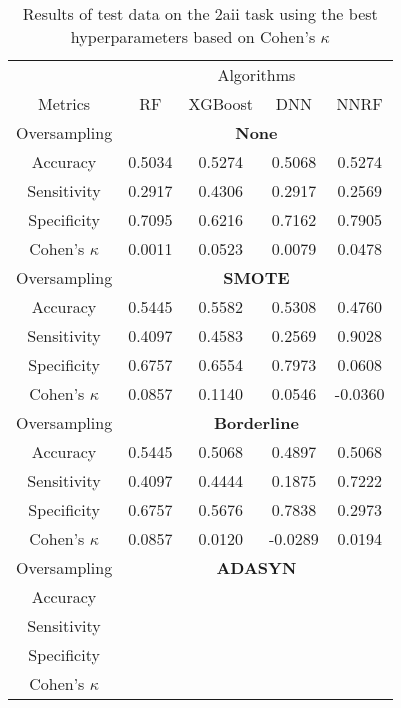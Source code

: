 \begin{table}[!htb]
\centering
\caption{Results of test data on the 2aii task using the best hyperparameters based on Cohen's $\kappa$}
\label{tab:2aii_test_results}
\begin{tabular}{c | c c c c}
\hline
 & \multicolumn{4}{c}{Algorithms}\\ 
Metrics &RF & XGBoost & DNN & NNRF\\ 
\hline
Oversampling &\multicolumn{4}{|c}{\textbf{None}}\\ 
\hline
Accuracy & 0.5034 & 0.5274 & 0.5068 & 0.5274\\ 
Sensitivity & 0.2917 & 0.4306 & 0.2917 & 0.2569\\ 
Specificity & 0.7095 & 0.6216 & 0.7162 & 0.7905\\ 
Cohen's $\kappa$ & 0.0011 & 0.0523 & 0.0079 & 0.0478\\ 
\hline
Oversampling &\multicolumn{4}{|c}{\textbf{SMOTE}}\\ 
\hline
Accuracy & 0.5445 & 0.5582 & 0.5308 & 0.4760\\ 
Sensitivity & 0.4097 & 0.4583 & 0.2569 & 0.9028\\ 
Specificity & 0.6757 & 0.6554 & 0.7973 & 0.0608\\ 
Cohen's $\kappa$ & 0.0857 & 0.1140 & 0.0546 & -0.0360\\ 
\hline
Oversampling &\multicolumn{4}{|c}{\textbf{Borderline}}\\ 
\hline
Accuracy & 0.5445 & 0.5068 & 0.4897 & 0.5068\\ 
Sensitivity & 0.4097 & 0.4444 & 0.1875 & 0.7222\\ 
Specificity & 0.6757 & 0.5676 & 0.7838 & 0.2973\\ 
Cohen's $\kappa$ & 0.0857 & 0.0120 & -0.0289 & 0.0194\\ 
\hline
Oversampling &\multicolumn{4}{|c}{\textbf{ADASYN}}\\ 
\hline
Accuracy &  &  &  & \\ 
Sensitivity &  &  &  & \\ 
Specificity &  &  &  & \\ 
Cohen's $\kappa$ &  &  &  & \\ 
\hline
\end{tabular}
\end{table}


